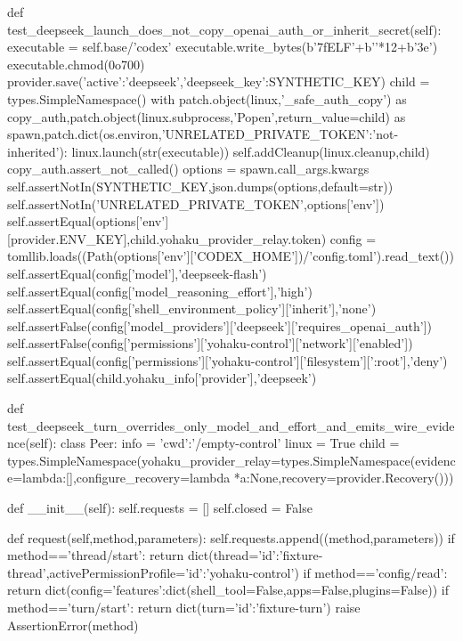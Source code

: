     def test_deepseek_launch_does_not_copy_openai_auth_or_inherit_secret(self):
        executable = self.base/'codex'
        executable.write_bytes(b'\x7fELF'+b'\0'*12+b'\x3e')
        executable.chmod(0o700)
        provider.save({'active':'deepseek','deepseek_key':SYNTHETIC_KEY})
        child = types.SimpleNamespace()
        with patch.object(linux,'_safe_auth_copy') as copy_auth,patch.object(linux.subprocess,'Popen',return_value=child) as spawn,patch.dict(os.environ,{'UNRELATED_PRIVATE_TOKEN':'not-inherited'}):
            linux.launch(str(executable))
        self.addCleanup(linux.cleanup,child)
        copy_auth.assert_not_called()
        options = spawn.call_args.kwargs
        self.assertNotIn(SYNTHETIC_KEY,json.dumps(options,default=str))
        self.assertNotIn('UNRELATED_PRIVATE_TOKEN',options['env'])
        self.assertEqual(options['env'][provider.ENV_KEY],child.yohaku_provider_relay.token)
        config = tomllib.loads((Path(options['env']['CODEX_HOME'])/'config.toml').read_text())
        self.assertEqual(config['model'],'deepseek-flash')
        self.assertEqual(config['model_reasoning_effort'],'high')
        self.assertEqual(config['shell_environment_policy']['inherit'],'none')
        self.assertFalse(config['model_providers']['deepseek']['requires_openai_auth'])
        self.assertFalse(config['permissions']['yohaku-control']['network']['enabled'])
        self.assertEqual(config['permissions']['yohaku-control']['filesystem'][':root'],'deny')
        self.assertEqual(child.yohaku_info['provider'],'deepseek')

    def test_deepseek_turn_overrides_only_model_and_effort_and_emits_wire_evidence(self):
        class Peer:
            info = {'cwd':'/empty-control'}
            linux = True
            child = types.SimpleNamespace(yohaku_provider_relay=types.SimpleNamespace(evidence=lambda:[],configure_recovery=lambda *a:None,recovery=provider.Recovery()))

            def __init__(self):
                self.requests = []
                self.closed = False

            def request(self,method,parameters):
                self.requests.append((method,parameters))
                if method=='thread/start':
                    return dict(thread={'id':'fixture-thread'},activePermissionProfile={'id':'yohaku-control'})
                if method=='config/read':
                    return dict(config={'features':dict(shell_tool=False,apps=False,plugins=False)})
                if method=='turn/start':
                    return dict(turn={'id':'fixture-turn'})
                raise AssertionError(method)

